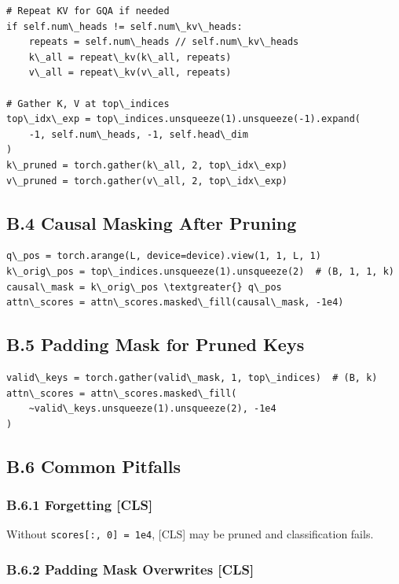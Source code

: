 \begin{lstlisting}
# Repeat KV for GQA if needed
if self.num\_heads != self.num\_kv\_heads:
    repeats = self.num\_heads // self.num\_kv\_heads
    k\_all = repeat\_kv(k\_all, repeats)
    v\_all = repeat\_kv(v\_all, repeats)

# Gather K, V at top\_indices
top\_idx\_exp = top\_indices.unsqueeze(1).unsqueeze(-1).expand(
    -1, self.num\_heads, -1, self.head\_dim
)
k\_pruned = torch.gather(k\_all, 2, top\_idx\_exp)
v\_pruned = torch.gather(v\_all, 2, top\_idx\_exp)
\end{lstlisting}

\subsection{B.4 Causal Masking After Pruning}

\begin{lstlisting}
q\_pos = torch.arange(L, device=device).view(1, 1, L, 1)
k\_orig\_pos = top\_indices.unsqueeze(1).unsqueeze(2)  # (B, 1, 1, k)
causal\_mask = k\_orig\_pos \textgreater{} q\_pos
attn\_scores = attn\_scores.masked\_fill(causal\_mask, -1e4)
\end{lstlisting}

\subsection{B.5 Padding Mask for Pruned Keys}

\begin{lstlisting}
valid\_keys = torch.gather(valid\_mask, 1, top\_indices)  # (B, k)
attn\_scores = attn\_scores.masked\_fill(
    ~valid\_keys.unsqueeze(1).unsqueeze(2), -1e4
)
\end{lstlisting}

\subsection{B.6 Common Pitfalls}

\subsubsection{B.6.1 Forgetting [CLS]}

Without \texttt{scores[:, 0] = 1e4}, [CLS] may be pruned and classification fails.

\subsubsection{B.6.2 Padding Mask Overwrites [CLS]}

